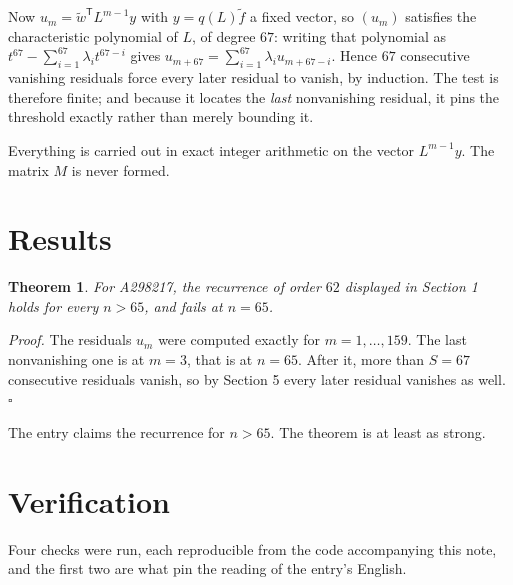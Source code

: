 \documentclass[11pt]{article}
\newtheorem{theorem}{Theorem}
\theoremstyle{definition}
\begin{document}
Now $u_m = \tilde w^{\mathsf T} L^{m-1} y$ with $y = q(L)\tilde f$ a fixed vector, so $(u_m)$ satisfies the characteristic polynomial of $L$, of degree $67$: writing that polynomial as $t^{67} - \sum_{i=1}^{67} \lambda_i t^{67-i}$ gives $u_{m+67} = \sum_{i=1}^{67} \lambda_i u_{m+67-i}$. Hence $67$ consecutive vanishing residuals force every later residual to vanish, by induction. The test is therefore finite; and because it locates the {\itshape last} nonvanishing residual, it pins the threshold exactly rather than merely bounding it.

Everything is carried out in exact integer arithmetic on the vector $L^{m-1}y$. The matrix $M$ is never formed.

\section{Results}

\begin{theorem} For A298217, the recurrence of order $62$ displayed in Section 1 holds for every $n > 65$, and fails at $n = 65$.\end{theorem}

{\itshape Proof.} The residuals $u_m$ were computed exactly for $m = 1,\dots,159$. The last nonvanishing one is at $m = 3$, that is at $n = 65$. After it, more than $S = 67$ consecutive residuals vanish, so by Section 5 every later residual vanishes as well. $\square$

The entry claims the recurrence for $n > 65$. The theorem is at least as strong.

\section{Verification}

Four checks were run, each reproducible from the code accompanying this note, and the first two are what pin the reading of the entry's English.
\end{document}
